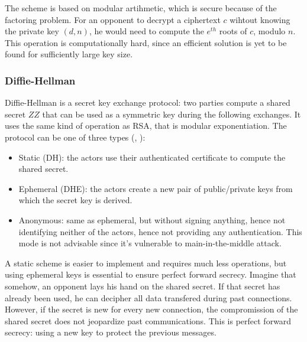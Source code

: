 The scheme is based on modular artihmetic, which is secure because of the factoring problem.
For an opponent to decrypt a ciphertext $c$ wihtout knowing the private key $(d, n)$, he would need to compute the $e^{th}$ roots of $c$, modulo $n$.
This operation is computationally hard, since an efficient solution is yet to be found for sufficiently large key size.


\subsubsection{Diffie-Hellman}
Diffie-Hellman is a secret key exchange protocol: two parties compute a shared secret $ZZ$ that can be used as a symmetric key during the following exchanges.
It uses the same kind of operation as RSA, that is modular exponentiation.
The protocol can be one of three types (\cite{rfc2631}, \cite{Frankel:2005:SGI:2206289}):
\begin{itemize}
	\item Static (DH): the actors use their authenticated certificate to compute the shared secret.
	\item Ephemeral (DHE): the actors create a new pair of public/private keys from which the secret key is derived.
	\item Anonymous: same as ephemeral, but without signing anything, hence not identifying neither of the actors, hence not providing any authentication. This mode is not advisable since it's vulnerable to main-in-the-middle attack.
\end{itemize}
A static scheme is easier to implement and requires much less operations, but using ephemeral keys is essential to ensure perfect forward secrecy.
Imagine that somehow, an opponent lays his hand on the shared secret.
If that secret has already been used, he can decipher all data transfered during past connections.
However, if the secret is new for every new connection, the compromission of the shared secret does not jeopardize past communications.
This is perfect forward secrecy: using a new key to protect the previous messages.

